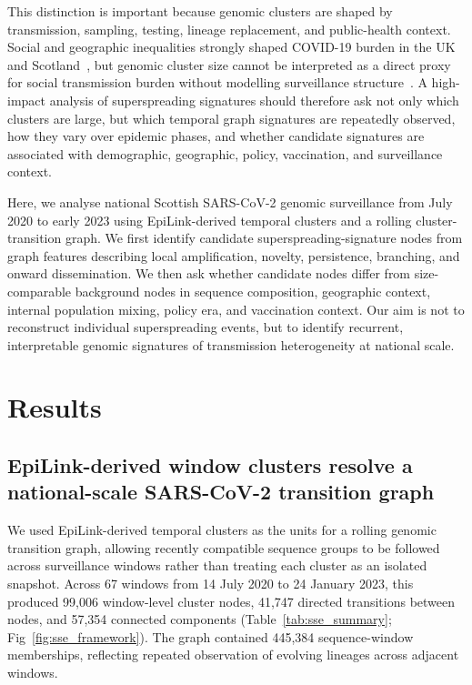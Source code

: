 \documentclass[10pt,letterpaper]{article}
\begin{document}
This distinction is important because genomic clusters are shaped by transmission, sampling, testing, lineage replacement, and public-health context. Social and geographic inequalities strongly shaped COVID-19 burden in the UK and Scotland~\cite{Bambra2020,Niedzwiedz2020,Mathur2021,Whitehead2021,PublicHealthScotland2020,Marmot2020,Sheikh2021}, but genomic cluster size cannot be interpreted as a direct proxy for social transmission burden without modelling surveillance structure~\cite{Han2023,Chen2022,ECDC2021}. A high-impact analysis of superspreading signatures should therefore ask not only which clusters are large, but which temporal graph signatures are repeatedly observed, how they vary over epidemic phases, and whether candidate signatures are associated with demographic, geographic, policy, vaccination, and surveillance context.

Here, we analyse national Scottish SARS-CoV-2 genomic surveillance from July 2020 to early 2023 using EpiLink-derived temporal clusters and a rolling cluster-transition graph. We first identify candidate superspreading-signature nodes from graph features describing local amplification, novelty, persistence, branching, and onward dissemination. We then ask whether candidate nodes differ from size-comparable background nodes in sequence composition, geographic context, internal population mixing, policy era, and vaccination context. Our aim is not to reconstruct individual superspreading events, but to identify recurrent, interpretable genomic signatures of transmission heterogeneity at national scale.

\section*{Results}

\subsection*{EpiLink-derived window clusters resolve a national-scale SARS-CoV-2 transition graph}

We used EpiLink-derived temporal clusters as the units for a rolling genomic transition graph, allowing recently compatible sequence groups to be followed across surveillance windows rather than treating each cluster as an isolated snapshot. Across 67 windows from 14 July 2020 to 24 January 2023, this produced 99,006 window-level cluster nodes, 41,747 directed transitions between nodes, and 57,354 connected components (Table~\ref{tab:sse_summary}; Fig~\ref{fig:sse_framework}). The graph contained 445,384 sequence-window memberships, reflecting repeated observation of evolving lineages across adjacent windows.
\end{document}
